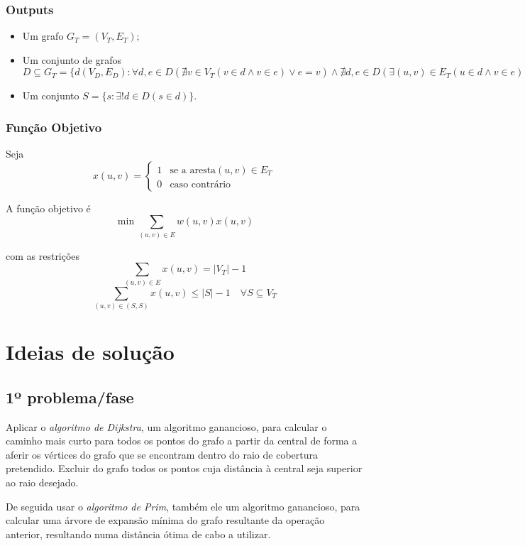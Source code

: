\documentclass[a4paper,12pt,titlepage]{article}
\begin{document}
\subsubsection*{Outputs}
\begin{itemize}
\item Um grafo $G_T = ( V_T,E_T )$;
\item Um conjunto de grafos $D \subseteq G_T = \{d(V_D,E_D): \forall d,e \in D(\nexists v \in V_T(v \in d \land v \in e) \lor e=v) \land \nexists d,e\in D(\exists(u,v) \in E_T(u \in d \land v \in e)) \land u\neq v \}$
\item Um conjunto $S = \{s : \exists! d \in D(s \in d)\}$.
\end{itemize}

\subsubsection*{Função Objetivo}
Seja $$x(u,v) = \begin{cases}
1 & \text{se a aresta} (u,v) \in E_T\\
0 & \text{caso contrário} 
\end{cases}$$

A função objetivo é\cite{ieor_mst}
$$\min \sum_{(u,v)\in E} w(u,v)x(u,v)$$

com as restrições 
$$\sum_{(u,v)\in E} x(u,v) = |V_T| - 1$$
$$\sum_{(u,v)\in (S,S)} x(u,v) \leq |S| - 1 \quad \forall S \subseteq V_T$$
\linebreak
\linebreak
\linebreak
\linebreak
\section{Ideias de solução}
\subsection{1º problema/fase}
Aplicar o \emph{algoritmo de Dijkstra}, um algoritmo ganancioso, para calcular o caminho mais curto para todos os pontos do grafo a partir da central de forma a aferir os vértices do grafo que se encontram dentro do raio de cobertura pretendido. Excluir do grafo todos os pontos cuja distância à central seja superior ao raio desejado.

De seguida usar o \emph{algoritmo de Prim}, também ele um algoritmo ganancioso, para calcular uma árvore de expansão mínima do grafo resultante da operação anterior, resultando numa distância ótima de cabo a utilizar.
\end{document}
